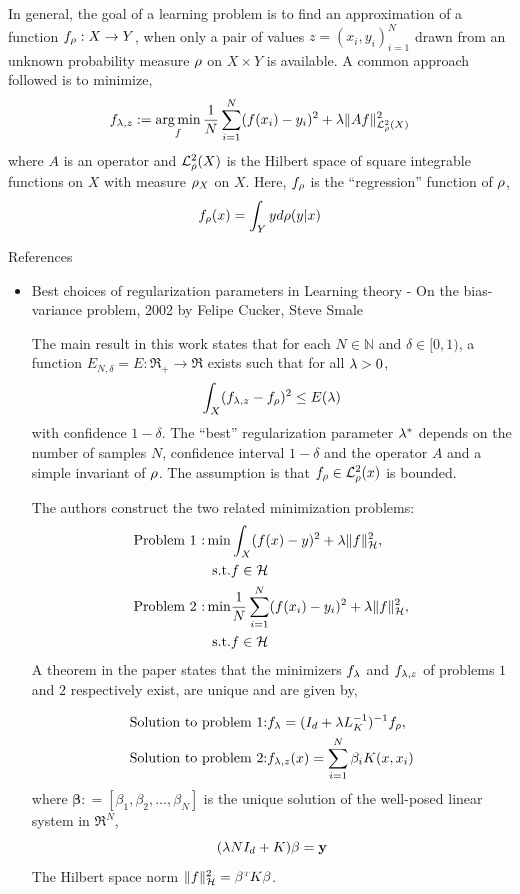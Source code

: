 In general, the goal of a learning problem is to find an approximation of a function $f_\rho : X \to Y$, when only a pair of values $z = (x_i, y_i)_{i=1}^N$ drawn from an unknown probability measure $\rho$ on $X \times Y$ is available. A common approach followed is to minimize,
\[
f_{\lambda,z} := \mathop{\rm arg{\,}min}_f \frac{1}{N}\sum_{i=1}^N (f(x_i) - y_i)^2 + \lambda \|A f \|^2_{\mathcal{L}_{\rho}^2(X)}
\]
where $A$ is an operator and $\mathcal{L}^2_{\rho}(X)$ is the Hilbert space of square integrable functions on $X$ with measure $\rho_X$ on $X$. Here, $f_\rho$ is the ``regression'' function of $\rho$,
\begin{equation}
f_\pr(x) = \int_Y y d\pr(y|x)
\label{eq:f_rho}
\end{equation}

References
\begin{itemize}
\item Best choices of regularization parameters in Learning theory - On the bias-variance problem, 2002 by Felipe Cucker, Steve Smale


The main result in this work states that for each $N\in \mathbb{N}$ and $\delta \in [0,1)$, a function $E_{N,\delta} = E : \Re_+ \to \Re$ exists such that for all $\lambda >0$,
\[
\int_X (f_{\lambda,z} - f_\rho)^2 \leq E(\lambda)
\]
with confidence $1-\delta$. The ``best'' regularization parameter $\lambda^*$ depends on the number of samples $N$, confidence interval $1-\delta$ and the operator $A$ and a simple invariant of $\rho$. The assumption is that $f_\rho \in \mathcal{L}^2_\rho(x)$ is bounded. 

The authors construct the two related minimization problems: 
\[
\begin{aligned}
\text{Problem 1 :} \min & \int_X(f(x) - y)^2 + \reg \|f\|^2_\clH, \\
\text{s.t.} & f \in \clH \\
%
\text{Problem 2 :} \min & \frac{1}{N} \sum_{i=1}^N (f(x_i) - y_i)^2 + \reg \|f\|^2_\clH,\\
\text{s.t.} & f \in \clH
\end{aligned}
\]
A theorem in the paper states that the minimizers $f_\lambda$ and $f_{\lambda,z}$ of problems $1$ and $2$ respectively exist, are unique and are given by, 

\[
\begin{aligned}
\text{Solution to problem 1:} &
f_\lambda = (I_d + \lambda L_K^{-1})^{-1} f_\rho, \\
\text{Solution to problem 2:} & 
f_{\lambda,z}(x) = \sum_{i=1}^N \beta_i K(x,x_i)
\end{aligned}
\]
where $\mathbf{\beta}: = [\beta_1, \beta_2, \hdots, \beta_N]$ is the unique solution of the well-posed linear system in $\Re^N$,
\[
(\lambda N I_d + K) \mathbf{\beta} = \mathbf{y}
\]
The Hilbert space norm $\|f\|^2_{\cal H} = \beta^{\hbox{\tiny\it T}} K \beta$.


\end{itemize}
